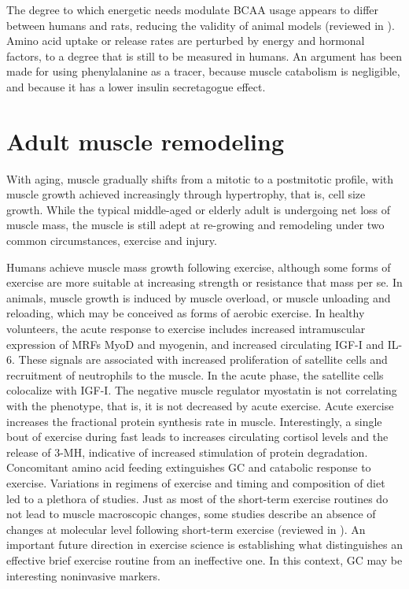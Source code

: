 \documentclass[12pt,english]{report}\usepackage[]{graphicx}\usepackage[]{color}
\begin{document}
The degree to which energetic needs modulate BCAA usage appears to
differ between humans and rats, reducing the validity of animal models
(reviewed in \citep{matthews2005observations}). Amino acid uptake
or release rates are perturbed by energy and hormonal factors, to
a degree that is still to be measured in humans. An argument has been
made for using phenylalanine as a tracer, because muscle catabolism
is negligible, and because it has a lower insulin secretagogue effect\citep{garlick1980rapid,cynober2003metabolic}.


\section{Adult muscle remodeling}

With aging, muscle gradually shifts from a mitotic to a postmitotic
profile, with muscle growth achieved increasingly through hypertrophy,
that is, cell size growth. While the typical middle-aged or elderly
adult is undergoing net loss of muscle mass, the muscle is still adept
at re-growing and remodeling under two common circumstances, exercise
and injury.

Humans achieve muscle mass growth following exercise, although some
forms of exercise are more suitable at increasing strength or resistance
that mass per se. In animals, muscle growth is induced by muscle
overload, or muscle unloading and reloading, which may be conceived
as forms of aerobic exercise. In healthy volunteers, the acute response
to exercise includes increased intramuscular expression of MRFs MyoD
and myogenin, and increased circulating IGF-I and IL-6\citep{grubb2014igf-1,ullum1994bicycle,bickel2005time}.
These signals are associated with increased proliferation of satellite
cells and recruitment of neutrophils to the muscle\citep{fielding1993acute,snijders2014acute}.
In the acute phase, the satellite cells colocalize with IGF-I\citep{grubb2014igf-1}.
The negative muscle regulator myostatin is not correlating with the
phenotype, that is, it is not decreased by acute exercise\citep{snijders2014acute,schiffer2011mstn}.
Acute exercise increases the fractional protein synthesis rate in
muscle\citep{dreyer2010resistance,harber2010muscle}. Interestingly,
a single bout of exercise during fast leads to increases circulating
cortisol levels and the release of 3-MH, indicative of increased stimulation
of protein degradation\citep{bird2006liquid}. Concomitant amino acid
feeding extinguishes GC and catabolic response to exercise. Variations
in regimens of exercise and timing and composition of diet led to
a plethora of studies. Just as most of the short-term exercise routines
do not lead to muscle macroscopic changes, some studies describe an
absence of changes at molecular level following short-term exercise
(reviewed in \citep{vanloon2014there}). An important future direction
in exercise science is establishing what distinguishes an effective
brief exercise routine from an ineffective one. In this context, GC
may be interesting noninvasive markers.
\end{document}
